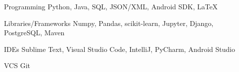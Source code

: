 
\begin{cvskills}

\cvskill
{Programming} 
{Python, Java, SQL, JSON/XML, Android SDK, LaTeX}

\cvskill
{Libraries/Frameworks}
{Numpy, Pandas, scikit-learn, Jupyter, Django, PostgreSQL, Maven}

\cvskill
{IDEs}
{Sublime Text, Visual Studio Code, IntelliJ, PyCharm, Android Studio}

\cvskill
{VCS}
{Git}





\end{cvskills}
